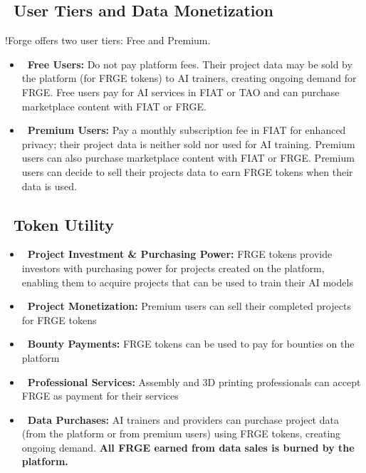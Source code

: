 
\subsection*{\faUsers\ User Tiers and Data Monetization}

!Forge offers two user tiers: Free and Premium.

\begin{itemize}[leftmargin=*]
    \item \textbf{\textcolor{fabPrimary}{\faUser\ Free Users:}} Do not pay platform fees. Their project data may be sold by the platform (for FRGE tokens) to AI trainers, creating ongoing demand for FRGE. Free users pay for AI services in FIAT or TAO and can purchase marketplace content with FIAT or FRGE.
    \item \textbf{\textcolor{fabAccent}{\faUserPlus\ Premium Users:}} Pay a monthly subscription fee in FIAT for enhanced privacy; their project data is neither sold nor used for AI training. Premium users can also purchase marketplace content with FIAT or FRGE. Premium users can decide to sell their projects data to earn FRGE tokens when their data is used.
\end{itemize}

\subsection*{\faExchange\ Token Utility}
\begin{itemize}[leftmargin=*]
    \item \textbf{\textcolor{fabRed}{\faBitcoin\ Project Investment \& Purchasing Power:}} FRGE tokens provide investors with purchasing power for projects created on the platform, enabling them to acquire projects that can be used to train their AI models
    \item \textbf{\textcolor{fabRed}{\faDollar\ Project Monetization:}} Premium users can sell their completed projects for FRGE tokens
    \item \textbf{\textcolor{fabRed}{\faBullseye\ Bounty Payments:}} FRGE tokens can be used to pay for bounties on the platform
    \item \textbf{\textcolor{fabRed}{\faWrench\ Professional Services:}} Assembly and 3D printing professionals can accept FRGE as payment for their services
    \item \textbf{\textcolor{fabRed}{\faDatabase\ Data Purchases:}} AI trainers and providers can purchase project data (from the platform or from premium users) using FRGE tokens, creating ongoing demand. \textbf{All FRGE earned from data sales is burned by the platform.}
\end{itemize}


